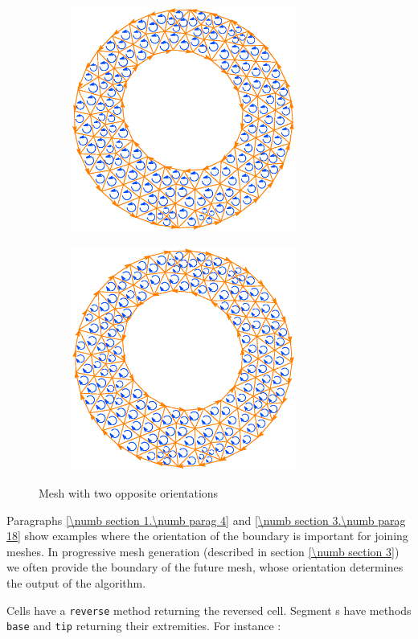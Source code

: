 \begin{figure}[ht] \centering
\begin{subfigure}{75mm}\centering
  \includegraphics[width=74mm]{oriented-annulus-1}
\end{subfigure}  
\begin{subfigure}{75mm}\centering
  \includegraphics[width=74mm]{oriented-annulus-2}
\end{subfigure}  
  \caption{Mesh with two opposite orientations}
  \label{\numb section 1.\numb fig 4}
\end{figure}

Paragraphs \ref{\numb section 1.\numb parag 4} and \ref{\numb section 3.\numb parag 18}
show examples where the orientation of the boundary is important for joining meshes.
In progressive mesh generation (described in section \ref{\numb section 3}) we often
provide the boundary of the future mesh, whose orientation determines the output of the
algorithm.
\vfil\eject

Cells have a {\small\tt reverse} method returning the reversed cell.
Segment {\small\tt {}}s have methods {\small\tt base} and {\small\tt tip} returning their extremities.
For instance :

